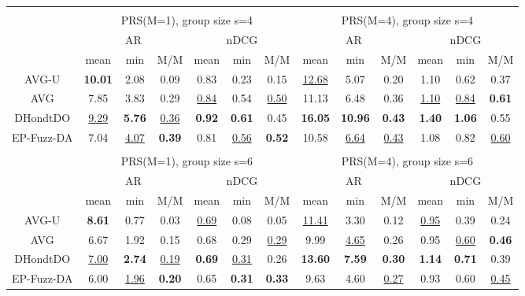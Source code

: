 \begin{tabular}{ c | c c c | c c c || c c c | c c c }
\multicolumn{12}{c}{} \\
\multicolumn{1}{c}{} & \multicolumn{6}{c}{PRS(M=1), group size s=4} & \multicolumn{6}{c}{PRS(M=4), group size s=4} \\
\multicolumn{1}{c}{} & \multicolumn{3}{c}{AR} & \multicolumn{3}{c}{nDCG} & \multicolumn{3}{c}{AR} & \multicolumn{3}{c}{nDCG} \\
& mean & min & M/M & mean & min & M/M & mean & min & M/M & mean & min & M/M \\
\hline
AVG-U & \textbf{10.01} & 2.08 & 0.09 & 0.83 & 0.23 & 0.15 & \underline{12.68} & 5.07 & 0.20 & 1.10 & 0.62 & 0.37 \\
AVG & 7.85 & 3.83 & 0.29 & \underline{0.84} & 0.54 & \underline{0.50} & 11.13 & 6.48 & 0.36 & \underline{1.10} & \underline{0.84} & \textbf{0.61} \\
DHondtDO & \underline{9.29} & \textbf{5.76} & \underline{0.36} & \textbf{0.92} & \textbf{0.61} & 0.45 & \textbf{16.05} & \textbf{10.96} & \textbf{0.43} & \textbf{1.40} & \textbf{1.06} & 0.55 \\
EP-Fuzz-DA & 7.04 & \underline{4.07} & \textbf{0.39} & 0.81 & \underline{0.56} & \textbf{0.52} & 10.58 & \underline{6.64} & \underline{0.43} & 1.08 & 0.82 & \underline{0.60} \\

\multicolumn{12}{c}{} \\
\multicolumn{1}{c}{} & \multicolumn{6}{c}{PRS(M=1), group size s=6} & \multicolumn{6}{c}{PRS(M=4), group size s=6} \\
\multicolumn{1}{c}{} & \multicolumn{3}{c}{AR} & \multicolumn{3}{c}{nDCG} & \multicolumn{3}{c}{AR} & \multicolumn{3}{c}{nDCG} \\
& mean & min & M/M & mean & min & M/M & mean & min & M/M & mean & min & M/M \\
\hline
AVG-U & \textbf{8.61} & 0.77 & 0.03 & \underline{0.69} & 0.08 & 0.05 & \underline{11.41} & 3.30 & 0.12 & \underline{0.95} & 0.39 & 0.24 \\
AVG & 6.67 & 1.92 & 0.15 & 0.68 & 0.29 & \underline{0.29} & 9.99 & \underline{4.65} & 0.26 & 0.95 & \underline{0.60} & \textbf{0.46} \\
DHondtDO & \underline{7.00} & \textbf{2.74} & \underline{0.19} & \textbf{0.69} & \underline{0.31} & 0.26 & \textbf{13.60} & \textbf{7.59} & \textbf{0.30} & \textbf{1.14} & \textbf{0.71} & 0.39 \\
EP-Fuzz-DA & 6.00 & \underline{1.96} & \textbf{0.20} & 0.65 & \textbf{0.31} & \textbf{0.33} & 9.63 & 4.60 & \underline{0.27} & 0.93 & 0.60 & \underline{0.45} \\


\end{tabular}
